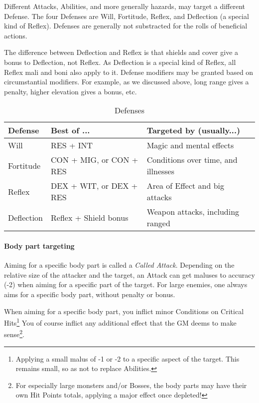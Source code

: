 Different Attacks, Abilities, and more generally hazards, may target a different Defense. The four Defenses are Will, Fortitude, Reflex, and Deflection (a special kind of Reflex). Defenses are generally not substracted for the rolls of beneficial actions. 

The difference between Deflection and Reflex is that shields and cover give a bonus to Deflection, not Reflex. As Deflection is a special kind of Reflex, all Reflex mali and boni also apply to it. Defense modifiers may be granted based on circumstantial modifiers. For example, as we discussed above, long range gives a penalty, higher elevation gives a bonus, etc.

\begin{table*}[h!tbp]
	\begin{center}
		\begin{tabular}{p{2cm}p{5cm}p{7cm}} \toprule
			
		    \textbf{Defense} & \textbf{Best of ...} & \textbf{Targeted by (usually...)} \\ \midrule

		    Will & RES + INT & Magic and mental effects \\
		    Fortitude & CON + MIG, or CON + RES & Conditions over time, and illnesses \\
		    Reflex & DEX + WIT, or DEX + RES & Area of Effect and big attacks \\
		    Deflection & Reflex + Shield bonus & Weapon attacks, including ranged \\

		    \bottomrule
		\end{tabular}
	\end{center}
	\caption{Defenses}
  \label{defenses_table}
\end{table*}


\paragraph{Body part targeting}

\label{called_shot}

Aiming for a specific body part is called a \textit{Called Attack}. Depending on the relative size of the attacker and the target, an Attack can get maluses to accuracy (-2) when aiming for a specific part of the target. For large enemies, one always aims for a specific body part, without penalty or bonus.

When aiming for a specific body part, you inflict minor Conditions on Critical Hits\footnote{Applying a small malus of -1 or -2 to a specific aspect of the target. This remains small, so as not to replace Abilities.} You of course inflict any additional effect that the GM deems to make sense\footnote{For especially large monsters and/or Bosses, the body parts may have their own Hit Points totals, applying a major effect once depleted!}.

